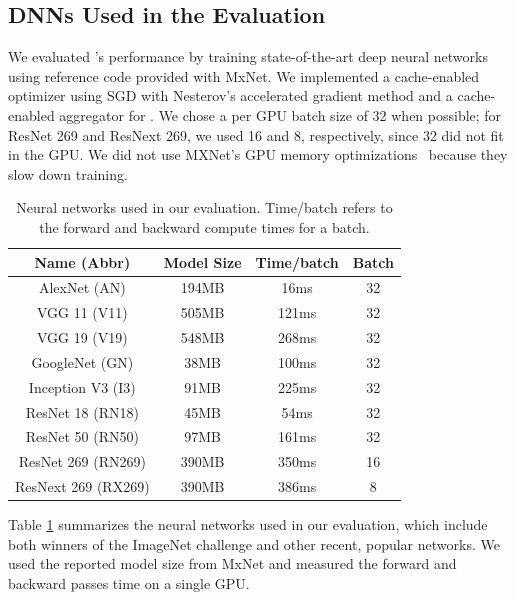 \subsection{DNNs Used in the Evaluation}
We evaluated \phub{}'s performance by training state-of-the-art deep neural networks using reference code provided with MxNet. %
We implemented a cache-enabled optimizer using SGD with Nesterov's accelerated gradient method \cite{nesterov1983method} and a cache-enabled aggregator for \phub{}. We chose a per GPU batch size of 32 when possible; for ResNet 269 and ResNext 269, we used 16 and 8, respectively, since 32 did not fit in the GPU. We did not use MXNet's GPU memory optimizations~\cite{chen2016training} because they slow down training.

\begin{table}[t!]
	\centering
	\begin{tabular}{|c|c|c|c|}
		\hline 
		Name (Abbr)           & Model Size & Time/batch & Batch \\
		\hline
		AlexNet (AN)      & 194MB & 16ms &  32 \\
		\hline 
		VGG 11 (V11)       & 505MB & 121ms & 32 \\
		\hline
		VGG 19 (V19)      & 548MB & 268ms & 32 \\
		\hline
		GoogleNet (GN)   &  38MB & 100ms & 32 \\
		\hline
		Inception V3 (I3) & 91MB  & 225ms & 32 \\
		\hline
		ResNet 18 (RN18)   & 45MB & 54ms & 32 \\
		\hline
		ResNet 50 (RN50)   & 97MB & 161ms & 32 \\
		\hline  
		ResNet 269 (RN269)  & 390MB & 350ms & 16 \\
		\hline
		ResNext 269 (RX269) & 390MB & 386ms & 8 \\
		\hline
	\end{tabular}
	\caption{Neural networks used in our evaluation. Time/batch refers to the forward and backward compute times for a batch.}
	\label{table:networkCharacterization}
\end{table}


Table \ref{table:networkCharacterization} summarizes the neural networks used in our evaluation, which include both winners of the ImageNet challenge and other recent, popular networks. We used the reported model size from MxNet and measured the forward and backward passes time on a single GPU. %

